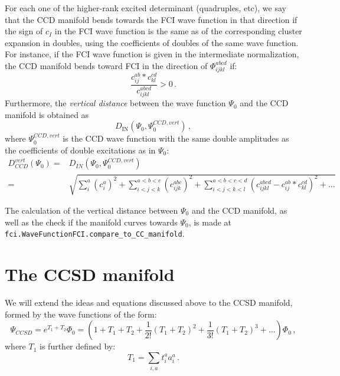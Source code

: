 For each one of the higher-rank excited determinant (quadruples, etc),
we say that the CCD manifold bends towards the FCI wave function in that direction if
the sign of $c_I$ in the FCI wave function is the same as of the corresponding cluster expansion
in doubles, using the coefficients of doubles of the same wave function.
For instance, if the FCI wave function is given in the intermediate normalization,
the CCD manifold bends toward FCI in the direction of $\Phi_{ijkl}^{abcd}$ if:
\begin{equation}
  \frac{c_{ij}^{ab} * c_{kl}^{cd}}{c_{ijkl}^{abcd}} > 0\,.
\end{equation}
Furthermore,
the \emph{vertical distance} between the wave function $\Psi_0$ and the CCD manifold is obtained as
\begin{equation}
  D_\text{IN}(\Psi_0, \Psi_0^{CCD,vert})\,,
\end{equation}
where $\Psi_0^{CCD,vert}$ is the CCD wave function
with the same double amplitudes as the coefficients of double excitations as in $\Psi_0$:
\begin{equation}
  \begin{split}
    D_{CCD}^{vert}(\Psi_0) =& D_{IN}(\Psi_0, \Psi_0^{CCD,vert})\\
    =& \sqrt{
      \sum_i^a (c_i^a)^2
      + \sum_{i<j<k}^{a<b<c} (c_{ijk}^{abc})^2
      + \sum_{i<j<k<l}^{a<b<c<d}(c_{ijkl}^{abcd} - c_{ij}^{ab} * c_{kl}^{cd})^2 + \dots
    }
  \end{split}
\end{equation}

The calculation of the vertical distance between $\Psi_0$ and the CCD manifold,
as well as the check if the manifold curves towards $\Psi_0$,
is made at \texttt{fci.WaveFunctionFCI.compare\_to\_CC\_manifold}.

\section{The CCSD manifold}
We will extend the ideas and equations discussed above to the CCSD manifold,
formed by the wave functions of the form:
\begin{equation}
  \Psi_{CCSD} = e^{T_1 + T_2} \Phi_0 =
  \left(1 + T_1 + T_2 + \frac{1}{2!}(T_1 + T_2)^2 + \frac{1}{3!}(T_1 + T_2)^3 + ...\right) \Phi_0\,,
\end{equation}
where $T_1$ is further defined by:
\begin{equation}
  T_1 = \sum_{i,a} t_i^a a_i^a\,.
\end{equation}

